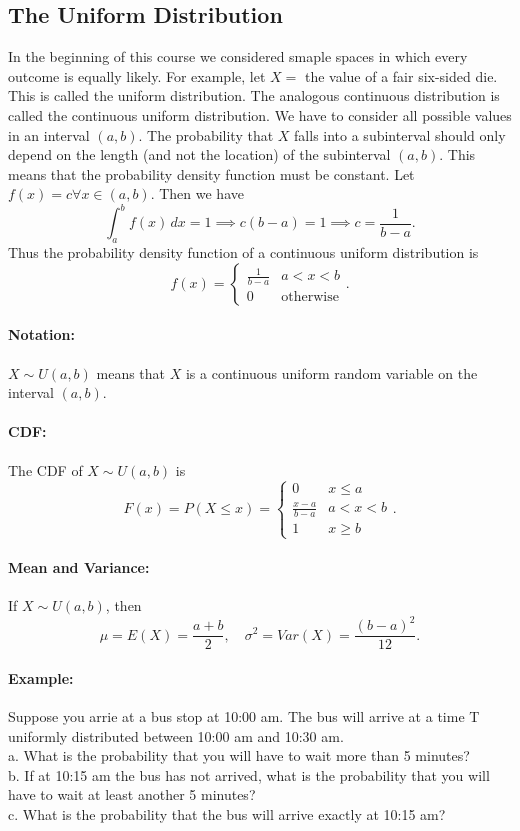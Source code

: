 \subsection{The Uniform Distribution}
\hrulefill

In the beginning of this course we considered smaple spaces in which every outcome is equally likely.
For example, let $X =$ the value of a fair six-sided die.
This is called the uniform distribution. The analogous continuous distribution is called the continuous 
uniform distribution. We have to consider all possible values in an interval $(a,b)$. The probability that $X$
falls into a subinterval should only depend on the length (and not the location) of the subinterval $(a,b)$.
This means that the probability density function must be constant. Let $f(x) = c \forall x \in (a,b)$.
Then we have
\[\int_a^b f(x) \, dx = 1 \implies c(b-a) = 1 \implies c = \frac{1}{b-a}.\]
Thus the probability density function of a continuous uniform distribution is
\[f(x) = \begin{cases}
\frac{1}{b-a} & a < x < b \\
0 & \text{otherwise}
\end{cases}.\]

\paragraph*{Notation:} $X \sim U(a,b)$ means that $X$ is a continuous uniform random variable on the 
interval $(a,b)$.

\paragraph*{CDF:} The CDF of $X \sim U(a,b)$ is
\[F(x) = P(X \leq x) = \begin{cases}
0 & x \leq a \\
\frac{x-a}{b-a} & a < x < b \\
1 & x \geq b
\end{cases}.\]

\paragraph*{Mean and Variance:} If $X \sim U(a,b)$, then
\[\mu = E(X) = \frac{a+b}{2}, \quad \sigma^2 = Var(X) = \frac{(b-a)^2}{12}.\]

\pagebreak

\paragraph*{Example:}
Suppose you arrie at a bus stop at 10:00 am. The bus will arrive at a time T uniformly distributed between 
10:00 am and 10:30 am.\\
a. What is the probability that you will have to wait more than 5 minutes?\\
b. If at 10:15 am the bus has not arrived, what is the probability that you will have to wait 
at least another 5 minutes?\\
c. What is the probability that the bus will arrive exactly at 10:15 am?

